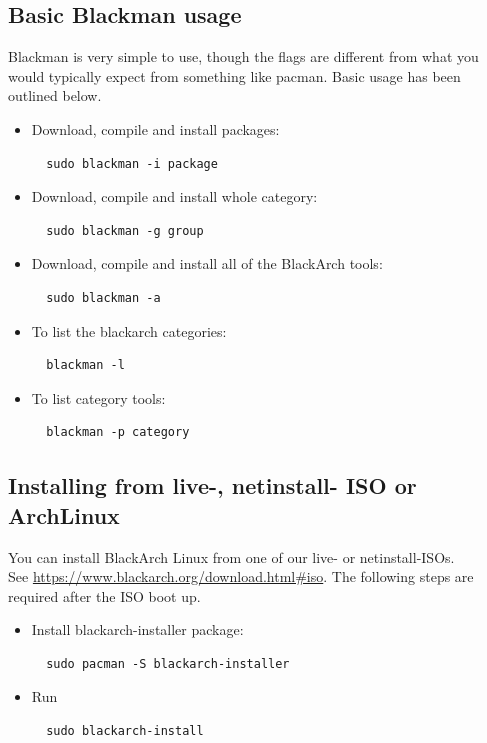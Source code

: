 \documentclass[a4paper, oneside, 11pt]{book}
\begin{document}
\subsection{Basic Blackman usage} Blackman is very simple to use, though the flags are different from what you
would typically expect from something like pacman. Basic usage has been outlined below.
\begin{itemize}
\item Download, compile and install packages:
\begin{lstlisting}
  sudo blackman -i package
\end{lstlisting}

\item Download, compile and install whole category:
\begin{lstlisting}
  sudo blackman -g group
\end{lstlisting}

\item Download, compile and install all of the BlackArch tools:
\begin{lstlisting}
  sudo blackman -a
\end{lstlisting}

\item To list the blackarch categories:
\begin{lstlisting}
  blackman -l
\end{lstlisting}

\item To list category tools:
\begin{lstlisting}
  blackman -p category
\end{lstlisting}

\end{itemize}

\subsection{Installing from live-, netinstall- ISO or ArchLinux}
You can install BlackArch Linux from one of our live- or netinstall-ISOs.\\See
\url{https://www.blackarch.org/download.html#iso}. The following steps are
required after the ISO boot up.
\begin{itemize}
\item Install blackarch-installer package:
\begin{lstlisting}
  sudo pacman -S blackarch-installer
\end{lstlisting}

\item Run
\begin{lstlisting}
  sudo blackarch-install
\end{lstlisting}

\end{itemize}
\end{document}
